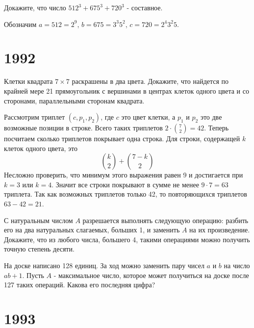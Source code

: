 \documentclass[11pt, a4paper]{problems_template}
\begin{document}
\begin{exercise}[56]
Докажите, что число $512^{3} + 675^{3} + 720^{3}$ - составное.
\end{exercise}

\begin{Solution}
Обозначим $a = 512 = 2^{9}$, $b = 675 = 3^{3}5^{2}$, $c = 720 = 2^{4}3^{2}5$.
\end{Solution}



\chapter{1992}

\begin{exercise}[19]
Клетки квадрата $7 \times 7$ раскрашены в два цвета. Докажите, что найдется по крайней мере 21 прямоугольник с вершинами в центрах клеток одного цвета и со сторонами, параллельными сторонам квадрата.
\end{exercise}

\begin{Solution}
Рассмотрим триплет $(c, p_{1}, p_{2})$, где $c$ это цвет клетки, а $p_{1}$ и $p_{2}$ это две возможные позиции в строке. Всего таких триплетов $2 \cdot \binom{7}{2} = 42$. Теперь посчитаем сколько триплетов покрывает одна строка. Для строки, содержащей $k$ клеток одного цвета, это
$$
\binom{k}{2} + \binom{7 - k}{2}
$$  
Несложно проверить, что минимум этого выражения равен 9 и достигается при $k = 3$ или $k = 4$. Значит все строки покрывают в сумме не менее $9 \cdot 7 = 63$ триплета. Так как возможных триплетов только 42, то повторяющихся триплетов $63 - 42 = 21$.
\end{Solution}

\begin{exercise}
С натуральным числом $A$ разрешается выполнять следующую операцию: разбить его на два натуральных слагаемых, больших 1, и заменить $A$ на их произведение. Докажите, что из любого числа, большего 4, такими операциями можно получить точную степень десяти.
\end{exercise}

\begin{exercise}[49]
На доске написано 128 единиц. За ход можно заменить пару чисел $a$ и $b$ на число $ab+1$. Пусть $A$ - максимальное число, которое может получиться на доске после 127 таких операций. Какова его последняя цифра?
\end{exercise}


\chapter{1993}
\end{document}
